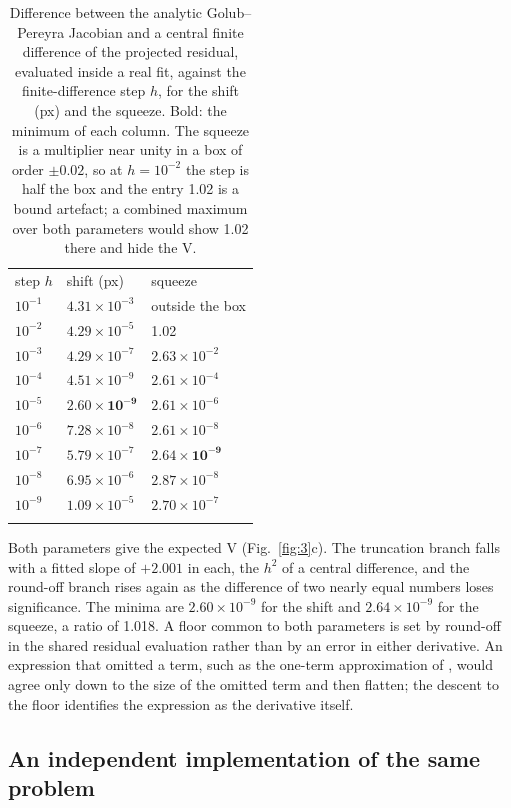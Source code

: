 \begin{table}[t]
\caption{Difference between the analytic Golub--Pereyra Jacobian and a central finite difference of the projected residual, evaluated inside a real fit, against the finite-difference step $h$, for the shift (px) and the squeeze. Bold: the minimum of each column. The squeeze is a multiplier near unity in a box of order $\pm 0.02$, so at $h = 10^{-2}$ the step is half the box and the entry 1.02 is a bound artefact; a combined maximum over both parameters would show 1.02 there and hide the V.}
\label{tab:jacobian_steps}
\begin{tabular}{lll}
\tophline
step $h$ & shift (px) & squeeze \\
\middlehline
$10^{-1}$ & $4.31\times10^{-3}$ & outside the box \\
$10^{-2}$ & $4.29\times10^{-5}$ & 1.02 \\
$10^{-3}$ & $4.29\times10^{-7}$ & $2.63\times10^{-2}$ \\
$10^{-4}$ & $4.51\times10^{-9}$ & $2.61\times10^{-4}$ \\
$10^{-5}$ & $\mathbf{2.60\times10^{-9}}$ & $2.61\times10^{-6}$ \\
$10^{-6}$ & $7.28\times10^{-8}$ & $2.61\times10^{-8}$ \\
$10^{-7}$ & $5.79\times10^{-7}$ & $\mathbf{2.64\times10^{-9}}$ \\
$10^{-8}$ & $6.95\times10^{-6}$ & $2.87\times10^{-8}$ \\
$10^{-9}$ & $1.09\times10^{-5}$ & $2.70\times10^{-7}$ \\
\bottomhline
\end{tabular}
\end{table}

Both parameters give the expected V (Fig.~\ref{fig:3}c). The truncation branch falls with a fitted slope of
$+2.001$ in each, the $h^2$ of a central difference, and the round-off branch rises again as the difference of two
nearly equal numbers loses significance. The minima are $2.60\times10^{-9}$ for the shift and $2.64\times10^{-9}$ for
the squeeze, a ratio of 1.018. A floor common to both parameters is set by round-off in the shared residual
evaluation rather than by an error in either derivative. An expression that omitted a term, such as the one-term
approximation of \citet{Kaufman_1975}, would agree only down to the size of the omitted term and then flatten; the
descent to the floor identifies the expression as the derivative itself.

\subsection{An independent implementation of the same problem}
\label{sec:3.3}

